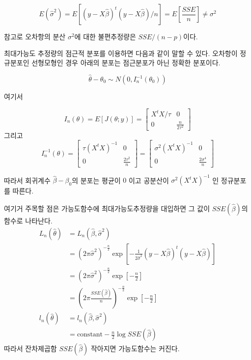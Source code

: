 \documentclass[
]{book}
\theoremstyle{definition}
\theoremstyle{definition}
\theoremstyle{definition}
\theoremstyle{remark}
\begin{document}
\[ E(\hat \sigma^2)  = E \left [ ( y- X  {\hat \beta})^t ( y- X  {\hat \beta})/n \right ] = E \left [ \frac{SSE}{n} \right ]  \ne \sigma^2 \]

참고로 오차항의 분산 \(\sigma^2\)에 대한 불편추정량은 \(SSE/(n-p)\)이다.

최대가능도 추정량의 점근적 분포를 이용하면 다음과 같이 말할 수 있다. 오차항이 정규분포인 선형모형인 경우 아래의 분포는 점근분포가 아닌 정확한 분포이다.

\[ \hat { \theta} -  \theta_0  \sim  N( 0,  I_n^{-1}( \theta_0)) \]

여기서

\[  I_n( \theta) = E[ J( \theta;  y)] =  
\begin{bmatrix}
      X^t X /\tau & 0   \\
    0  &   \frac{n}{2\tau^2} 
  \end{bmatrix}
\]
그리고
\[  I_n^{-1}( \theta) = 
\begin{bmatrix}
     \tau( X^t  X)^{-1}  & 0   \\
    0  &   \frac{2\tau^2}{n} 
  \end{bmatrix}
  = 
\begin{bmatrix}
     \sigma^2( X^t  X)^{-1}  & 0   \\
    0  &   \frac{2\sigma^4}{n} 
  \end{bmatrix}
\]

따라서 회귀계수 \(\hat { \beta}- \beta_0\)의 분포는 평균이 \(0\) 이고
공분산이 \(\sigma^2( X^t X)^{-1}\) 인 정규분포를 따른다.

여기거 주목할 점은 가능도함수에 최대가능도추정량을 대입하면 그 값이 \(SSE(\hat { \beta})\)의 함수로 나타난다.
\begin{align*}
 L_n(\hat { \theta} ) & = L_n(\hat { \beta} ,\hat \sigma^2 ) \\
 &=  (2\pi\hat \sigma^2)^{-\frac{n}{2}} \exp \left [-\frac{1}{2 \hat \sigma^2}( y- X \hat { \beta})^t( y- X \hat { \beta} ) \right ] \\
& = (2\pi\hat \sigma^2)^{-\frac{n}{2}} \exp \left [-\frac{n}{2} \right ] \\
& = \left (2\pi \frac{SSE(\hat { \beta})}{n} \right )^{-\frac{n}{2}} \exp \left [-\frac{n}{2} \right ] \\
l_n(\hat { \theta} ) &= l_n(\hat { \beta} ,\hat \sigma^2 ) \\
&= \text{constant}  - \frac{n}{2} \log SSE(\hat { \beta})
\end{align*}
따라서 잔차제곱함 \(SSE(\hat { \beta})\) 작아지면 가능도함수는 커진다.
\end{document}
